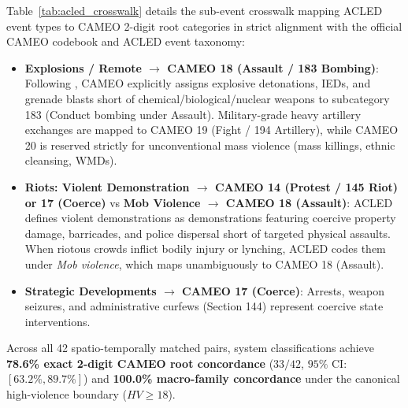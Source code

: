 \documentclass[11pt,a4paper]{article}
\begin{document}
Table~\ref{tab:acled_crosswalk} details the sub-event crosswalk mapping ACLED event types to CAMEO 2-digit root categories in strict alignment with the official CAMEO codebook \citep{schrodt2012} and ACLED event taxonomy:
\begin{itemize}
  \item \textbf{Explosions / Remote $\to$ CAMEO 18 (Assault / 183 Bombing)}: Following \citet{schrodt2012}, CAMEO explicitly assigns explosive detonations, IEDs, and grenade blasts short of chemical/biological/nuclear weapons to subcategory 183 (Conduct bombing under Assault). Military-grade heavy artillery exchanges are mapped to CAMEO 19 (Fight / 194 Artillery), while CAMEO 20 is reserved strictly for unconventional mass violence (mass killings, ethnic cleansing, WMDs).
  \item \textbf{Riots: Violent Demonstration $\to$ CAMEO 14 (Protest / 145 Riot) or 17 (Coerce)} vs \textbf{Mob Violence $\to$ CAMEO 18 (Assault)}: ACLED defines violent demonstrations as demonstrations featuring coercive property damage, barricades, and police dispersal short of targeted physical assaults. When riotous crowds inflict bodily injury or lynching, ACLED codes them under \textit{Mob violence}, which maps unambiguously to CAMEO 18 (Assault).
  \item \textbf{Strategic Developments $\to$ CAMEO 17 (Coerce)}: Arrests, weapon seizures, and administrative curfews (Section 144) represent coercive state interventions.
\end{itemize}
Across all 42 spatio-temporally matched pairs, system classifications achieve \textbf{78.6\% exact 2-digit CAMEO root concordance} ($33/42$, $95\%$ CI: $[63.2\%, 89.7\%]$) and \textbf{100.0\% macro-family concordance} under the canonical high-violence boundary ($HV \ge 18$).
\end{document}
